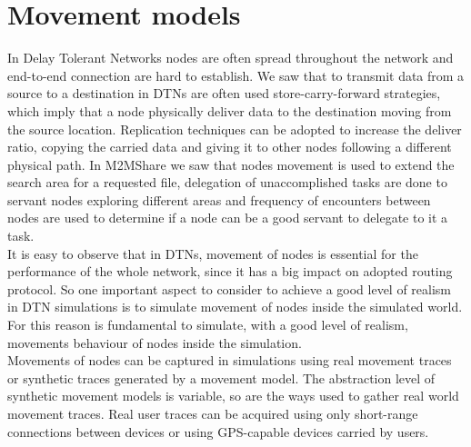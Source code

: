 
\chapter{Movement models}\label{movimento} %





In Delay Tolerant Networks nodes are often spread throughout the network and end-to-end connection are hard to establish. We saw that to transmit data from a source to a destination in DTNs are often used store-carry-forward strategies, which imply that a node physically deliver data to the destination moving from the source location. Replication techniques can be adopted to increase the deliver ratio, copying the carried data and giving it to other nodes following a different physical path. In M2MShare we saw that nodes movement is used to extend the search area for a requested file, delegation of unaccomplished tasks are done to servant nodes exploring different areas and frequency of encounters between nodes are used to determine if a node can be a good servant to delegate to it a task.
\\

It is easy to observe that in DTNs, movement of nodes is essential for the performance of the whole network, since it has a big impact on adopted routing protocol. So one important aspect to consider to achieve a good level of realism in DTN simulations is to simulate movement of nodes inside the simulated world.  For this reason is fundamental to simulate, with a good level of realism, movements behaviour of nodes inside the simulation. 
\\

Movements of nodes can be captured in simulations using real movement traces or synthetic traces generated by a movement model. The abstraction level of synthetic movement models is variable, so are the ways used to gather real world movement traces. Real user traces can be acquired using only short-range connections between devices or using GPS-capable devices carried by users.
\\

